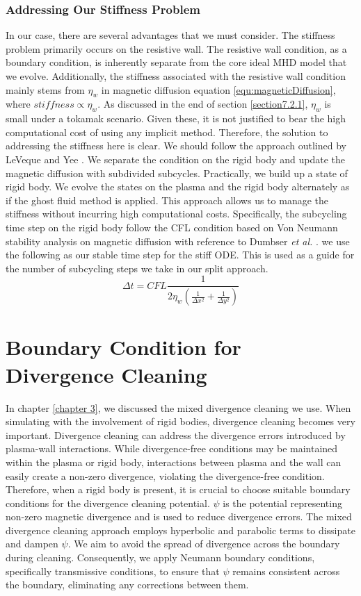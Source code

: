\subsubsection*{Addressing Our Stiffness Problem}
In our case, there are several advantages that we must consider. The stiffness problem primarily occurs on the resistive wall. The resistive wall condition, as a boundary condition, is inherently separate from the core ideal MHD model that we evolve. Additionally, the stiffness associated with the resistive wall condition mainly stems from $\eta_w$ in magnetic diffusion equation \ref{equ:magneticDiffusion}, where $\textit{stiffness}\propto \eta_w$. As discussed in the end of section \ref{section7.2.1}, $\eta_w$ is small under a tokamak scenario. Given these, it is not justified to bear the high computational cost of using any implicit method. Therefore, the solution to addressing the stiffness here is clear. We should follow the approach outlined by LeVeque and Yee \cite{leveque1990study}. We separate the condition on the rigid body and update the magnetic diffusion with subdivided subcycles. Practically, we build up a state of rigid body. We evolve the states on the plasma and the rigid body alternately as if the ghost fluid method is applied. This approach allows us to manage the stiffness without incurring high computational costs. Specifically, the subcycling time step on the rigid body follow the CFL condition based on Von Neumann stability analysis on magnetic diffusion with reference to Dumbser \textit{et al.} \cite{dumbser2019divergence}. we use the following as our stable time step for the stiff ODE. This is used as a guide for the number of subcycling steps we take in our split approach.  
$$
\Delta t=CFL\frac{1}{2{{\eta }_{w}}\left( \frac{1}{\Delta {{x}^{2}}}+\frac{1}{\Delta {{y}^{2}}} \right)}
$$  

\section{Boundary Condition for Divergence Cleaning}
In chapter \ref{chapter 3}, we discussed the mixed divergence cleaning we use. When simulating with the involvement of rigid bodies, divergence cleaning becomes very important. Divergence cleaning can address the divergence errors introduced by plasma-wall interactions. While divergence-free conditions may be maintained within the plasma or rigid body, interactions between plasma and the wall can easily create a non-zero divergence, violating the divergence-free condition. Therefore, when a rigid body is present, it is crucial to choose suitable boundary conditions for the divergence cleaning potential. $\psi$ is the potential representing non-zero magnetic divergence and is used to reduce divergence errors. The mixed divergence cleaning approach employs hyperbolic and parabolic terms to dissipate and dampen $\psi$. We aim to avoid the spread of divergence across the boundary during cleaning. Consequently, we apply Neumann boundary conditions, specifically transmissive conditions, to ensure that $\psi$ remains consistent across the boundary, eliminating any corrections between them.

